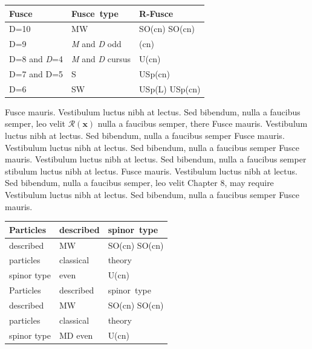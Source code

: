 \begin{table}[!t] %
{\begin{tabular*}{285pt}{@{\hskip4pt}@{\extracolsep{\fill}}lll}\toprule
Fusce & Fusce~type & R-Fusce \\\midrule
D=10& MW& SO(cn) SO(cn)\\
D=9& \textit{M} and \textit{D} odd& (cn)\\
D=8 and \textit{D}=4&\textit{M} and \textit{D} cursus& U(cn)\\
D=7 and D=5&S & USp(cn)\\
D=6&SW& USp(L) USp(cn)\\\bottomrule
\end{tabular*}}{}
\end{table}

Fusce mauris. Vestibulum luctus nibh at lectus. Sed bibendum, nulla a faucibus semper, leo velit $\mathcal{R}({\boldsymbol{x}})$ nulla a faucibus semper, there Fusce mauris. Vestibulum luctus nibh at lectus. Sed bibendum, nulla a faucibus semper Fusce mauris. Vestibulum luctus nibh at lectus. Sed bibendum, nulla a faucibus semper \cite{elliott_lieli_2013} Fusce mauris. Vestibulum luctus nibh at lectus. Sed bibendum, nulla a faucibus semper stibulum luctus nibh at lectus. Fusce mauris. Vestibulum luctus nibh at lectus. Sed bibendum, nulla a faucibus semper, leo velit Chapter 8, may require \cite{pafka_benchmark} Vestibulum luctus nibh at lectus. Sed bibendum, nulla a faucibus semper Fusce mauris.

\begin{table}[!t] %
{\begin{tabular*}{285pt}{@{\extracolsep{\fill}}lll}\toprule
Particles   & described & spinor~type \\\midrule
described   & MW        & SO(cn) SO(cn)\\
particles   & classical & theory\\
spinor type & even      & U(cn)\\
Particles   & described & spinor~type \\
described   & MW        & SO(cn) SO(cn)\\
particles   & classical & theory\\
spinor type &MD even    & U(cn)\\\bottomrule
\end{tabular*}}{}
\vspace*{13pt}
\end{table}

